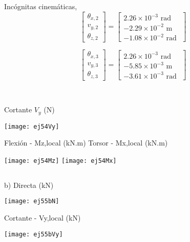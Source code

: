 \begin{minipage}{0.45\textwidth}
	Incógnitas cinemáticas,
	$$
	\left[
	\begin{matrix}
	\theta_{x,2} \\
	v_{y,2} \\
	\theta_{z,2}
	\end{matrix}
	\right]
	=
	\left[
	\begin{matrix}
	 2.26\times 10^{-3} \text{ rad }\\
	-2.29\times 10^{-2} \text{ m }\\
	-1.08\times 10^{-2} \text{ rad }
	\end{matrix}
	\right]
	$$
	
	$$
	\left[
	\begin{matrix}
	\theta_{x,3} \\
	v_{y,3} \\
	\theta_{z,3}
	\end{matrix}
	\right]
	=
	\left[
	\begin{matrix}
	2.26\times 10^{-3} \text{ rad }\\
	-5.85\times 10^{-3} \text{ m }\\
	-3.61\times 10^{-3} \text{ rad }
	\end{matrix}
	\right]
	$$
\end{minipage}
~
\begin{minipage}{0.45\textwidth}
	Cortante $V_y$ (N)
	
	\texttt{[image: ej54Vy]}
\end{minipage}


Flexión - Mz,local (kN.m) \hfill  Torsor - Mx,local (kN.m)

\texttt{[image: ej54Mz]}
\texttt{[image: ej54Mx]}




\subsection{}


b)
Directa (kN)

	\begin{center}
	\texttt{[image: ej55bN]}
	\end{center}


Cortante - Vy,local (kN)

	\begin{center}
	\texttt{[image: ej55bVy]}
	\end{center}

